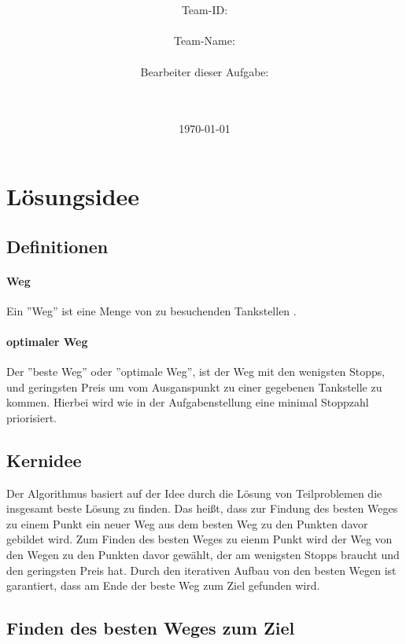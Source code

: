 \documentclass[a4paper,10pt,ngerman]{scrartcl}
\title{\textbf{\Huge\Aufgabe}}
\author{\LARGE Team-ID: \LARGE \TeamID \\\\
	    \LARGE Team-Name: \LARGE \TeamName \\\\
	    \LARGE Bearbeiter dieser Aufgabe: \\ 
	    \LARGE \Namen\\\\}
\date{\LARGE\today}
\begin{document}
\maketitle
\tableofcontents

\vspace{0.5cm}

\section{Lösungsidee}

\subsection{Definitionen}

\paragraph{Weg}

Ein ''Weg'' ist eine Menge von zu besuchenden Tankstellen .

\paragraph{optimaler Weg}

Der ''beste Weg'' oder ''optimale Weg'', ist der Weg mit den wenigsten Stopps, und geringsten Preis um vom Ausganspunkt zu einer gegebenen Tankstelle zu kommen. Hierbei wird wie in der Aufgabenstellung eine minimal Stoppzahl priorisiert.

\subsection{Kernidee}

Der Algorithmus basiert auf der Idee durch die Lösung von Teilproblemen die insgesamt beste Lösung zu finden. Das heißt, dass zur Findung des besten Weges zu einem Punkt ein neuer Weg aus dem besten Weg zu den Punkten davor gebildet wird. Zum Finden des besten Weges zu eienm Punkt wird der Weg von den Wegen zu den Punkten davor gewählt, der am wenigsten Stopps braucht und den geringsten Preis hat. Durch den iterativen Aufbau von den besten Wegen ist garantiert, dass am Ende der beste Weg zum Ziel gefunden wird.

\subsection{Finden des besten Weges zum Ziel}
\end{document}
